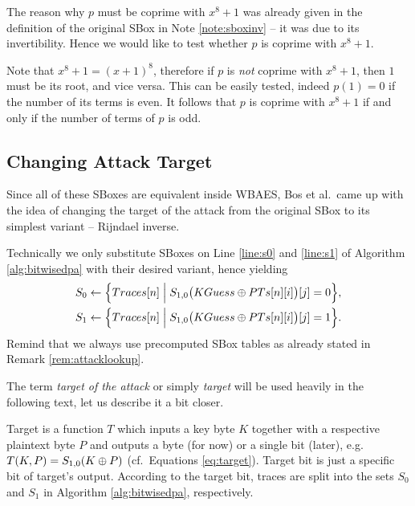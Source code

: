\begin{remark}
\label{rem:coprime}
	The reason why $p$ must be coprime with $x^8+1$ was already given in the definition of the original SBox in Note \ref{note:sboxinv} -- it was due to its invertibility. Hence we would like to test whether $p$ is coprime with $x^8+1$.
	
	Note that $x^8+1 = (x+1)^8$, therefore if $p$ is {\em not} coprime with $x^8+1$, then $1$ must be its root, and vice versa. This can be easily tested, indeed $p(1) = 0$ if the number of its terms is even. It follows that $p$ is coprime with $x^8+1$ if and only if the number of terms of $p$ is odd.
\end{remark}



\subsection{Changing Attack Target}
\label{sec:rijinv}

Since all of these SBoxes are equivalent inside WBAES, Bos et al.\ came up with the idea of changing the target of the attack from the original SBox to its simplest variant -- Rijndael inverse.

\begin{remark}
\label{rem:spq}
	Technically we only substitute SBoxes on Line \ref{line:s0} and \ref{line:s1} of Algorithm \ref{alg:bitwisedpa} with their desired variant, hence yielding
	\begin{align}
	\begin{split}
	\label{eq:target}
		S_0 &\gets \Bigl\{ Traces[n] \Bigm| S_{1,0}\bigl(KGuess\oplus PTs[n][i]\bigr)[j] = 0 \Bigr\} , \\
		S_1 &\gets \Bigl\{ Traces[n] \Bigm| S_{1,0}\bigl(KGuess\oplus PTs[n][i]\bigr)[j] = 1 \Bigr\} .
	\end{split}
	\end{align}
	Remind that we always use precomputed SBox tables as already stated in Remark \ref{rem:attacklookup}.
\end{remark}

\begin{note}
\label{note:target}
	The term {\em target of the attack} or simply {\em target} will be used heavily in the following text, let us describe it a bit closer.
	
	Target is a function $T$ which inputs a key byte $K$ together with a respective plaintext byte $P$ and outputs a byte (for now) or a single bit (later), e.g.\ $T(K,P) = S_{1,0}(K\oplus P)$ (cf.\ Equations \ref{eq:target}). Target bit is just a specific bit of target's output. According to the target bit, traces are split into the sets $S_0$ and $S_1$ in Algorithm \ref{alg:bitwisedpa}, respectively.
\end{note}

